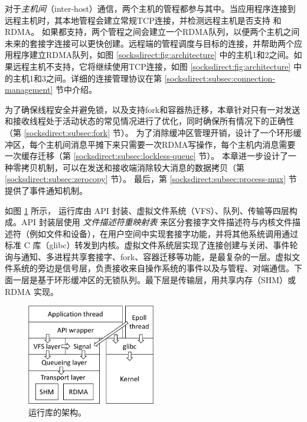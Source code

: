 对于\emph {主机间}（inter-host）通信，两个主机的管程都参与其中。当应用程序连接到远程主机时，其本地管程会建立常规TCP连接，并检测远程主机是否支持 \sys {} 和 RDMA。
如果都支持，两个管程之间会建立一个RDMA队列，以便两个主机之间未来的套接字连接可以更快创建。远程端的管程调度与目标的连接，并帮助两个应用程序建立RDMA队列，如图 \ref {socksdirect:fig:architecture} 中的主机1和2之间。如果远程主机不支持\sys {}，它将继续使用TCP连接，如图 \ref {socksdirect:fig:architecture} 中的主机1和3之间。详细的连接管理协议在第 \ref {socksdirect:subsec:connection-management} 节中介绍。

为了确保线程安全并避免锁，以及支持fork和容器热迁移，本章针对只有一对发送和接收线程处于活动状态的常见情况进行了优化，同时确保所有情况下的正确性（第 \ref {socksdirect:subsec:fork} 节）。
为了消除缓冲区管理开销，设计了一个环形缓冲区，每个主机间消息平摊下来只需要一次RDMA写操作，每个主机内消息需要一次缓存迁移（第 \ref {socksdirect:subsec:lockless-queue}  节）。
本章进一步设计了一种零拷贝机制，可以在发送和接收端消除较大消息的数据拷贝（第 \ref {socksdirect:subsec:zerocopy} 节）。
最后，第 \ref {socksdirect:subsec:process-mux} 节提供了事件通知机制。


如图 \ref{socksdirect:fig:libsd-architecture} 所示，\libipc{} 运行库由 API 封装、虚拟文件系统（VFS）、队列、传输等四层构成。API 封装层使用 \emph {文件描述符重映射表} 来区分套接字文件描述符与内核文件描述符（例如文件和设备），在用户空间中实现套接字功能，并将其他系统调用通过标准 C 库（glibc）转发到内核。虚拟文件系统层实现了连接创建与关闭、事件轮询与通知、多进程共享套接字、fork、容器迁移等功能，是最复杂的一层。虚拟文件系统的旁边是信号层，负责接收来自操作系统的事件以及与管程、对端通信。下面一层是基于环形缓冲区的无锁队列。最下层是传输层，用共享内存（SHM）或 RDMA 实现。

\begin{figure}[htbp]
	\centering
	\includegraphics[width=0.5\textwidth]{images/libsd_architecture}
	\caption{\libipc{} 运行库的架构。}
	\label{socksdirect:fig:libsd-architecture}
\end{figure}


